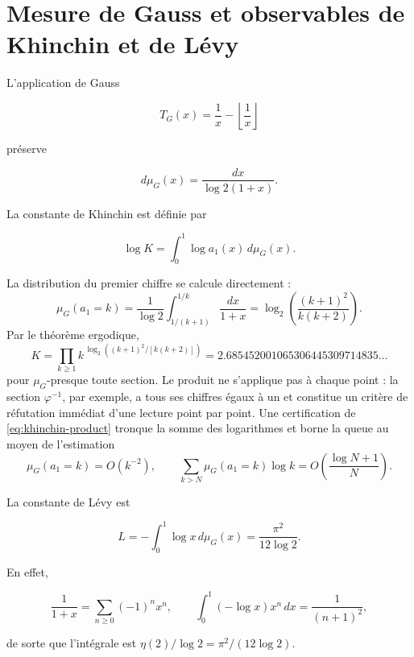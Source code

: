 \section{Mesure de Gauss et observables de Khinchin et de Lévy}

L'application de Gauss \cite{Khinchin,IosifescuKraaikamp}

\[
T_G(x)=\frac1x-\left\lfloor\frac1x\right\rfloor
\]

préserve

\begin{equation}
d\mu_G(x)=\frac{dx}{\log2(1+x)}.
\label{eq:gauss-measure}
\end{equation}

La constante de Khinchin est définie par

\begin{equation}
\log K=\int_0^1\log a_1(x)\,d\mu_G(x).
\label{eq:khinchin}
\end{equation}

La distribution du premier chiffre se calcule directement :
\begin{equation}
\mu_G(a_1=k)
=\frac1{\log2}\int_{1/(k+1)}^{1/k}\frac{dx}{1+x}
=\log_2\!\left(\frac{(k+1)^2}{k(k+2)}\right).
\label{eq:gauss-digit-law}
\end{equation}
Par le théorème ergodique,
\begin{equation}
K=\prod_{k\ge1}
k^{\,\log_2((k+1)^2/[k(k+2)])}
=2.685452001065306445309714835\ldots
\label{eq:khinchin-product}
\end{equation}
pour \(\mu_G\)-presque toute section. Le produit ne s'applique pas à chaque point :
la section \(\varphi^{-1}\), par exemple, a tous ses chiffres égaux
à un et constitue un critère de réfutation immédiat d'une lecture point par point. Une
certification de \cref{eq:khinchin-product} tronque la somme des logarithmes et
borne la queue au moyen de l'estimation
\[
\mu_G(a_1=k)=O(k^{-2}),
\qquad
\sum_{k>N}\mu_G(a_1=k)\log k
=O\!\left(\frac{\log N+1}{N}\right).
\]

La constante de Lévy est

\begin{equation}
L=-\int_0^1\log x\,d\mu_G(x)
=\frac{\pi^2}{12\log2}.
\label{eq:levy}
\end{equation}

En effet,

\[
\frac1{1+x}=\sum_{n\ge0}(-1)^nx^n,\qquad
\int_0^1(-\log x)x^n\,dx=\frac1{(n+1)^2},
\]

de sorte que l'intégrale est \(\eta(2)/\log2=\pi^2/(12\log2)\).

